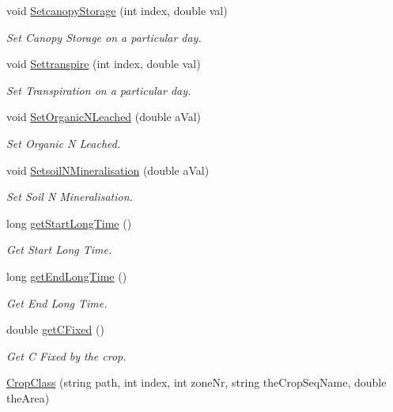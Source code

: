 \begin{DoxyCompactItemize}
void \mbox{\hyperlink{class_crop_class_a48d302f03ea98625f9f5ae883d1c39cb}{Setcanopy\+Storage}} (int index, double val)
\begin{DoxyCompactList}\small\item\em Set Canopy Storage on a particular day. \end{DoxyCompactList}\item 
void \mbox{\hyperlink{class_crop_class_a6f0cf7537a50f952860041afd264c656}{Settranspire}} (int index, double val)
\begin{DoxyCompactList}\small\item\em Set Transpiration on a particular day. \end{DoxyCompactList}\item 
void \mbox{\hyperlink{class_crop_class_a0c446a2a77172db039813777251ada6e}{Set\+Organic\+N\+Leached}} (double a\+Val)
\begin{DoxyCompactList}\small\item\em Set Organic N Leached. \end{DoxyCompactList}\item 
void \mbox{\hyperlink{class_crop_class_a39217655af73655bd52ac7cad47781c0}{Setsoil\+N\+Mineralisation}} (double a\+Val)
\begin{DoxyCompactList}\small\item\em Set Soil N Mineralisation. \end{DoxyCompactList}\item 
long \mbox{\hyperlink{class_crop_class_a2198c46bc32446b73f21307b78547ecb}{get\+Start\+Long\+Time}} ()
\begin{DoxyCompactList}\small\item\em Get Start Long Time. \end{DoxyCompactList}\item 
long \mbox{\hyperlink{class_crop_class_a29df37044f2b763fac4677714a1fbe47}{get\+End\+Long\+Time}} ()
\begin{DoxyCompactList}\small\item\em Get End Long Time. \end{DoxyCompactList}\item 
double \mbox{\hyperlink{class_crop_class_a7cdf534b135b2b31f0b15cb11299c73d}{get\+C\+Fixed}} ()
\begin{DoxyCompactList}\small\item\em Get C Fixed by the crop. \end{DoxyCompactList}\item 
\mbox{\hyperlink{class_crop_class_a1f02ef403977ce1a660de90ec3347d2f}{Crop\+Class}} (string path, int index, int zone\+Nr, string the\+Crop\+Seq\+Name, double the\+Area)

\end{DoxyCompactItemize}
